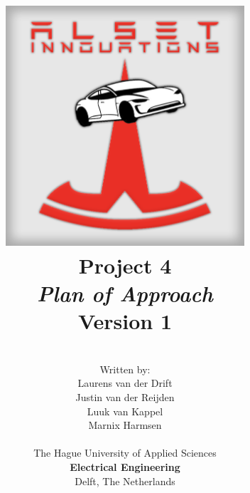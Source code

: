 \title{
\includegraphics[width=3.5in]{img/Logo.png} \\
\vspace*{1in}
\textbf{Project 4}\\
\textit{Plan of Approach}\\
Version 1
}
\author{
\vspace*{0.5in} \\
  Written by:\\
  Laurens van der Drift\\
  Justin van der Reijden\\
  Luuk van Kappel\\
  Marnix Harmsen\\
		\vspace*{0.2in} \\
		The Hague University of Applied Sciences\\
        \textbf{Electrical Engineering}\\
        Delft, The Netherlands
       } 